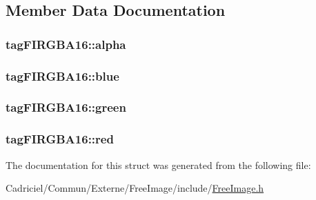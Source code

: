 \subsection{Member Data Documentation}
\hypertarget{structtag_f_i_r_g_b_a16_a9875250254b19efbfb321bf33ae2fdf6}{
\subsubsection[{alpha}]{ tag\-F\-I\-R\-G\-B\-A16\-::alpha}}\label{structtag_f_i_r_g_b_a16_a9875250254b19efbfb321bf33ae2fdf6}
\hypertarget{structtag_f_i_r_g_b_a16_afe4aa863b00988ad24831a1432ef837e}{
\subsubsection[{blue}]{ tag\-F\-I\-R\-G\-B\-A16\-::blue}}\label{structtag_f_i_r_g_b_a16_afe4aa863b00988ad24831a1432ef837e}
\hypertarget{structtag_f_i_r_g_b_a16_a0ae72ef6b7fe786b9ea6068579cd3f2d}{
\subsubsection[{green}]{ tag\-F\-I\-R\-G\-B\-A16\-::green}}\label{structtag_f_i_r_g_b_a16_a0ae72ef6b7fe786b9ea6068579cd3f2d}
\hypertarget{structtag_f_i_r_g_b_a16_a580143c8b2f5e28721972342a6facd01}{
\subsubsection[{red}]{ tag\-F\-I\-R\-G\-B\-A16\-::red}}\label{structtag_f_i_r_g_b_a16_a580143c8b2f5e28721972342a6facd01}


The documentation for this struct was generated from the following file\-:\begin{DoxyCompactItemize}
\item 
Cadriciel/\-Commun/\-Externe/\-Free\-Image/include/\hyperlink{_free_image_8h}{Free\-Image.\-h}\end{DoxyCompactItemize}
